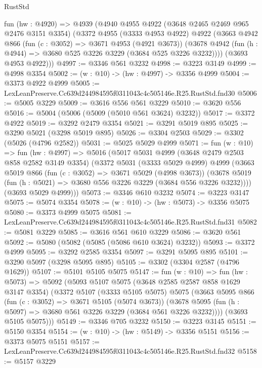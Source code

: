 \begin{lexlean}{RustStd}
\begin{coremodule}
  fun (hw : @4920) =>
  @4939
    (@4940
      @4955
      @4922
      (@3648 @2465 @2469 @965 @2476 @3151 @3354)
      (@3372
        @4955
        (@3333 @4953 @4922)
        @4922
        (@3663
          @4942
          @866
          (fun (c : @3052) => @3671 @4953 (@4921 @3673))
          (@3678 @4942 (fun (h : @4944) => @3680 @525 @3226 @3229 (@3684 @525 @3226 @3232))))
        (@3693 @4953 @4922)))
@4997 := @3346 @561 @3232
@4998 := @3223 @3149
@4999 := @4998 @3354
@5002 := (w : @10) -> (hw : @4997) -> @3356 @4999
@5004 := @3373 @4922 @4999
@5005 := LexLeanPreserve.Cc639d244984595f0311043c4c505146e.R25.RustStd.fnd30
@5006 := @5005 @3229
@5009 := @3616 @556 @561 @3229
@5010 := @3620 @556
@5016 := @5004 (@5006 (@5009 (@5010 @561 @3624) @3232))
@5017 := @3372 @4922
@5019 := @3292 @2479 @3354
@5021 := @3291 @5019 @895
@5025 := @3290 @5021 (@3298 @5019 @895)
@5026 := @3304 @2503
@5029 := @3302 (@5026 (@4796 @2582))
@5031 := @5025 @5029 @4999
@5071 := fun (w : @10) =>
  fun (hw : @4997) =>
  @5016
    (@5017
      @5031
      @4999
      (@3648 @2479 @2503 @858 @2582 @3149 @3354)
      (@3372
        @5031
        (@3333 @5029 @4999)
        @4999
        (@3663
          @5019
          @866
          (fun (c : @3052) => @3671 @5029 (@4998 @3673))
          (@3678 @5019 (fun (h : @5021) => @3680 @556 @3226 @3229 (@3684 @556 @3226 @3232))))
        (@3693 @5029 @4999)))
@5073 := @3346 @610 @3232
@5074 := @3223 @3147
@5075 := @5074 @3354
@5078 := (w : @10) -> (hw : @5073) -> @3356 @5075
@5080 := @3373 @4999 @5075
@5081 := LexLeanPreserve.Cc639d244984595f0311043c4c505146e.R25.RustStd.fnd31
@5082 := @5081 @3229
@5085 := @3616 @561 @610 @3229
@5086 := @3620 @561
@5092 := @5080 (@5082 (@5085 (@5086 @610 @3624) @3232))
@5093 := @3372 @4999
@5095 := @3292 @2585 @3354
@5097 := @3291 @5095 @895
@5101 := @3290 @5097 (@3298 @5095 @895)
@5105 := @3302 (@3304 @2587 (@4796 @1629))
@5107 := @5101 @5105 @5075
@5147 := fun (w : @10) =>
  fun (hw : @5073) =>
  @5092
    (@5093
      @5107
      @5075
      (@3648 @2585 @2587 @858 @1629 @3147 @3354)
      (@3372
        @5107
        (@3333 @5105 @5075)
        @5075
        (@3663
          @5095
          @866
          (fun (c : @3052) => @3671 @5105 (@5074 @3673))
          (@3678 @5095 (fun (h : @5097) => @3680 @561 @3226 @3229 (@3684 @561 @3226 @3232))))
        (@3693 @5105 @5075)))
@5149 := @3346 @705 @3232
@5150 := @3223 @3145
@5151 := @5150 @3354
@5154 := (w : @10) -> (hw : @5149) -> @3356 @5151
@5156 := @3373 @5075 @5151
@5157 := LexLeanPreserve.Cc639d244984595f0311043c4c505146e.R25.RustStd.fnd32
@5158 := @5157 @3229

\end{coremodule}
\end{lexlean}
